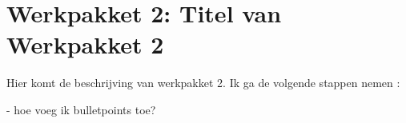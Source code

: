 \section{Werkpakket 2: Titel van Werkpakket 2}
Hier komt de beschrijving van werkpakket 2. Ik ga de volgende stappen nemen : 

- hoe voeg ik bulletpoints toe?
